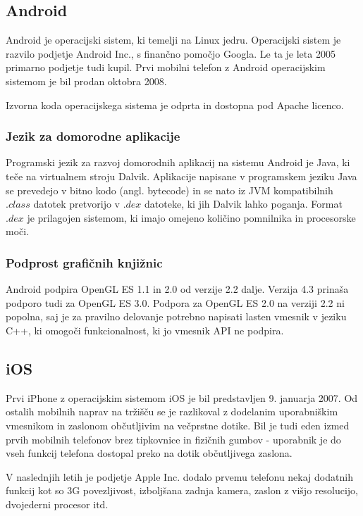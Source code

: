 \subsection{Android}

Android \cite{andriod} je operacijski sistem, ki temelji na Linux jedru. Operacijski sistem je razvilo podjetje Android Inc., s finančno pomočjo Googla. Le ta je leta 2005 primarno podjetje tudi kupil. Prvi mobilni telefon z Android operacijskim sistemom je bil prodan oktobra 2008.

Izvorna koda operacijskega sistema je odprta in dostopna pod Apache licenco.

\subsubsection{Jezik za domorodne aplikacije}

Programski jezik za razvoj domorodnih aplikacij na sistemu Android je Java, ki teče na virtualnem stroju Dalvik. Aplikacije napisane v programskem jeziku Java se prevedejo v bitno kodo (angl. bytecode) in se nato iz JVM kompatibilnih $.class$ datotek pretvorijo v $.dex$ datoteke, ki jih Dalvik lahko poganja. Format $.dex$ je prilagojen sistemom, ki imajo omejeno količino pomnilnika in procesorske moči.

\subsubsection{Podprost grafičnih knjižnic}

Android podpira OpenGL ES 1.1 in 2.0 od verzije 2.2 dalje. Verzija 4.3 prinaša podporo tudi za OpenGL ES 3.0. Podpora za OpenGL ES 2.0 na verziji 2.2 ni popolna, saj je za pravilno delovanje potrebno napisati lasten vmesnik v jeziku C++, ki omogoči funkcionalnost, ki jo vmesnik API ne podpira.

\subsection{iOS}

Prvi iPhone z operacijskim sistemom iOS \cite{ios} je bil predstavljen 9. januarja 2007. Od ostalih mobilnih naprav na tržišču se je razlikoval z dodelanim uporabniškim vmesnikom in zaslonom občutljivim na večprstne dotike. Bil je tudi eden izmed prvih mobilnih telefonov brez tipkovnice in fizičnih gumbov - uporabnik je do vseh funkcij telefona dostopal preko na dotik občutljivega zaslona.

V naslednjih letih je podjetje Apple Inc. dodalo prvemu telefonu nekaj dodatnih funkcij kot so 3G povezljivost, izboljšana zadnja kamera, zaslon z višjo resolucijo, dvojederni procesor itd.

